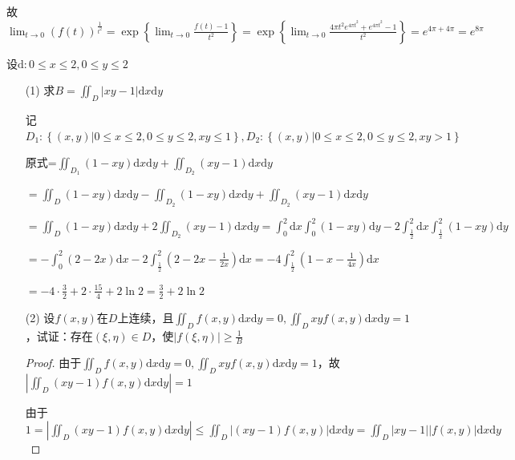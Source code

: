 \begin{xiti}
\begin{solution}
		故$\lim _{t \rightarrow 0}(f(t))^{\frac{1}{t^{2}}}=\exp \left\{\lim _{t \rightarrow 0} \frac{f(t)-1}{t^{2}}\right\}=\exp \left\{\lim _{t \rightarrow 0} \frac{4 \pi t^{2} e^{4 \pi t^{2}}+e^{4 \pi t^{2}}-1}{t^{2}}\right\}=e^{4 \pi+4 \pi}=e^{8 \pi}$
	\end{solution}
	\item 设$\mathrm{d}: 0 \leqslant x \leqslant 2,0 \leqslant y \leqslant 2$
	\begin{enumerate}
		\item [(1)] 求$B=\iint_{D}|x y-1| \mathrm{d} x \mathrm{d} y$
		\begin{solution}
			记$D_{1} : \left\{(x, y) |0 \leqslant x \leqslant 2,0 \leqslant y \leqslant 2, x y \leqslant 1\right\},D_{2} : \left\{(x, y) |0 \leqslant x \leqslant 2,0 \leqslant y \leqslant 2, x y >1 \right\}$
			
			原式=$\iint_{D_{1}} (1-x y) \mathrm{d} x \mathrm{d} y + \iint_{D_{2}}(x y-1) \mathrm{d} x \mathrm{d} y$
			
			$=\iint_{D} (1-x y) \mathrm{d} x \mathrm{d} y -\iint_{D_{2}} (1-x y) \mathrm{d} x \mathrm{d} y + \iint_{D_{2}}(x y-1) \mathrm{d} x \mathrm{d} y$
			
			$=\iint_{D} (1-x y) \mathrm{d} x \mathrm{d} y + 2 \iint_{D_{2}}(x y-1) \mathrm{d} x \mathrm{d} y = \int_{0}^{2} \mathrm{d} x \int_{0}^{2} (1-x y) \mathrm{d} y - 2\int_{\frac{1}{2}}^{2} \mathrm{d} x \int_{\frac{1}{x}}^{2} (1-x y) \mathrm{d} y$
			
			$= -\int_{0}^{2} (2-2x) \mathrm{d} x - 2\int_{\frac{1}{2}}^{2} \left( 2-2x-\frac{1}{2x} \right) \mathrm{d} x = - 4\int_{\frac{1}{2}}^{2} \left( 1-x-\frac{1}{4x} \right) \mathrm{d} x $
			
			$= - 4 \cdot \frac{3}{2} + 2 \cdot \frac{15}{4} + 2 \ln 2 =\frac{3}{2} + 2 \ln 2 $
		\end{solution}
		\item [(2)]设$f(x,y)$在$D$上连续，且$\iint_{D} f(x, y) \mathrm{d} x \mathrm{d} y=0, \iint_{D} x y f(x, y) \mathrm{d} x \mathrm{d} y=1$，试证：存在$(\xi, \eta) \in D$，使$|f(\xi, \eta)| \geqslant \frac{1}{B}$
		\begin{proof}
			由于$\iint_{D} f(x, y) \mathrm{d} x \mathrm{d} y=0, \iint_{D} x y f(x, y) \mathrm{d} x \mathrm{d} y=1$，故$\left| \iint_{D} (x y-1) f(x, y) \mathrm{d} x \mathrm{d} y \right|=1$
			
			由于$1=\left| \iint_{D} (x y-1) f(x, y) \mathrm{d} x \mathrm{d} y \right| \leqslant \iint_{D} |(x y-1) f(x, y)| \mathrm{d} x \mathrm{d} y =\iint_{D} |x y-1| |f(x, y)| \mathrm{d} x \mathrm{d} y$
			

\end{proof}
\end{enumerate}
\end{xiti}
